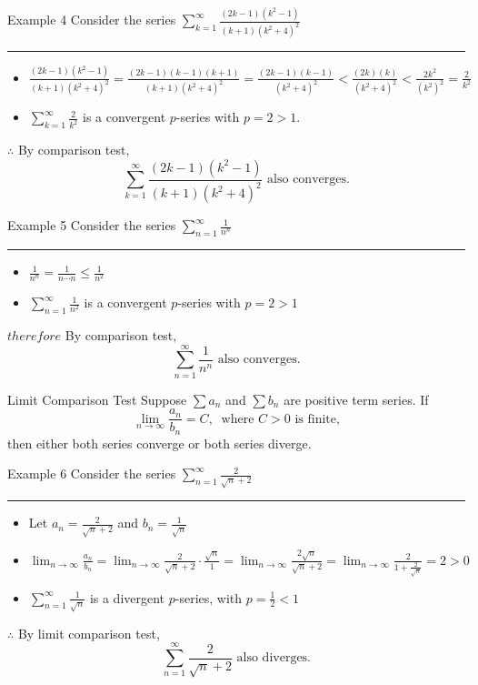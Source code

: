\documentclass[12pt,a4paper]{article}
\begin{document}
\begin{eg}{Example 4}
	Consider the series $\displaystyle\sum_{k=1}^\infty\frac{(2k-1)(k^2-1)}{(k+1)(k^2+4)^2}$\\
	\noindent\rule[0.25\baselineskip]{\textwidth}{1pt}
	\begin{itemize}
		\item $\displaystyle\frac{(2k-1)(k^2-1)}{(k+1)(k^2+4)^2}=\frac{(2k-1)(k-1)(k+1)}{(k+1)(k^2+4)^2}=\frac{(2k-1)(k-1)}{(k^2+4)^2}<\frac{(2k)(k)}{(k^2+4)^2}<\frac{2k^2}{(k^2)^2}=\frac{2}{k^2}$	
		\item $\displaystyle\sum_{k=1}^\infty\frac{2}{k^2}$ is a convergent $p$-series with $p=2>1$.
	\end{itemize}
	$\therefore$ By comparison test, 
	$$\sum_{k=1}^\infty\frac{(2k-1)(k^2-1)}{(k+1)(k^2+4)^2}\text{ also converges.}$$
\end{eg}
\begin{eg}{Example 5}
	Consider the series $\displaystyle\sum_{n=1}^\infty\frac{1}{n^n}$\\
	\noindent\rule[0.25\baselineskip]{\textwidth}{1pt}
	\begin{itemize}
		\item $\displaystyle\frac{1}{n^n}=\frac{1}{n\cdots n}\leq\frac{1}{n^2}$
		\item $\displaystyle\sum_{n=1}^\infty\frac{1}{n^2}$ is a convergent $p$-series with $p=2>1$
	\end{itemize}
	$therefore$ By comparison test,
	$$\sum_{n=1}^\infty\frac{1}{n^n}\text{ also converges.}$$
\end{eg}
\begin{thm}{Limit Comparison Test}
	Suppose $\displaystyle\sum{a_n}$ and $\displaystyle\sum{b_n}$ are positive term series. If $$\lim_{n\to\infty}\frac{a_n}{b_n}=C,\ \text{ where }C>0\text{ is finite,}$$ then either both series converge or both series diverge.	
\end{thm}
\begin{eg}{Example 6}
	Consider the series $\displaystyle\sum_{n=1}^\infty\frac{2}{\sqrt{n}+2}$\\
	\noindent\rule[0.25\baselineskip]{\textwidth}{1pt}
	\begin{itemize}
		\item Let $\displaystyle a_n=\frac{2}{\sqrt{n}+2}$ and $\displaystyle b_n=\frac{1}{\sqrt{n}}$
		\item $\displaystyle\lim_{n\to\infty}\frac{a_n}{b_n}=\lim_{n\to\infty}\frac{2}{\sqrt{n}+2}\cdot\frac{\sqrt{n}}{1}=\lim_{n\to\infty}\frac{2\sqrt{n}}{\sqrt{n}+2}=\lim_{n\to\infty}\frac{2}{1+\frac{2}{\sqrt{n}}}=2>0$
		\item $\displaystyle \sum_{n=1}^\infty\frac{1}{\sqrt{n}}$ is a divergent $p$-series, with $\displaystyle p=\frac{1}{2}<1$
	\end{itemize}
	$\therefore$ By limit comparison test,
	$$\sum_{n=1}^\infty\frac{2}{\sqrt{n}+2}\text{ also diverges.}$$
\end{eg}
\end{document}
